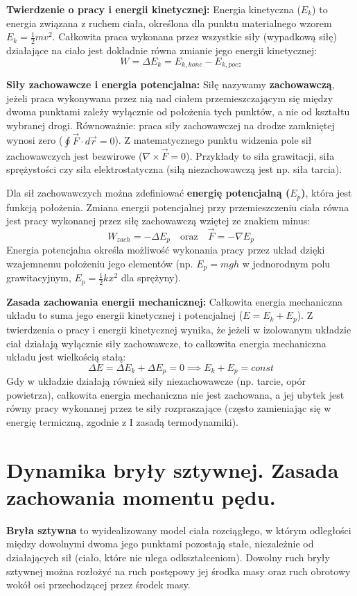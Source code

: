 \documentclass[11pt, a4paper]{article}
\begin{document}
\textbf{Twierdzenie o pracy i energii kinetycznej:} 
Energia kinetyczna ($E_k$) to energia związana z ruchem ciała, określona dla punktu materialnego wzorem $E_k = \frac{1}{2}mv^2$. Całkowita praca wykonana przez wszystkie siły (wypadkową siłę) działające na ciało jest dokładnie równa zmianie jego energii kinetycznej:
\[
W = \Delta E_k = E_{k, konc} - E_{k, pocz}
\]

\textbf{Siły zachowawcze i energia potencjalna:}
Siłę nazywamy \textbf{zachowawczą}, jeżeli praca wykonywana przez nią nad ciałem przemieszczającym się między dwoma punktami zależy wyłącznie od położenia tych punktów, a nie od kształtu wybranej drogi. Równoważnie: praca siły zachowawczej na drodze zamkniętej wynosi zero ($\oint \vec{F} \cdot d\vec{r} = 0$). Z matematycznego punktu widzenia pole sił zachowawczych jest bezwirowe ($\nabla \times \vec{F} = 0$). Przykłady to siła grawitacji, siła sprężystości czy siła elektrostatyczna (siłą niezachowawczą jest np. siła tarcia).

Dla sił zachowawczych można zdefiniować \textbf{energię potencjalną ($E_p$)}, która jest funkcją położenia. Zmiana energii potencjalnej przy przemieszczeniu ciała równa jest pracy wykonanej przez siłę zachowawczą wziętej ze znakiem minus:
\[
W_{zach} = -\Delta E_p \quad \text{oraz} \quad \vec{F} = -\nabla E_p
\]
Energia potencjalna określa możliwość wykonania pracy przez układ dzięki wzajemnemu położeniu jego elementów (np. $E_p = mgh$ w jednorodnym polu grawitacyjnym, $E_p = \frac{1}{2}kx^2$ dla sprężyny).

\textbf{Zasada zachowania energii mechanicznej:}
Całkowita energia mechaniczna układu to suma jego energii kinetycznej i potencjalnej ($E = E_k + E_p$). Z twierdzenia o pracy i energii kinetycznej wynika, że jeżeli w izolowanym układzie ciał działają wyłącznie siły zachowawcze, to całkowita energia mechaniczna układu jest wielkością stałą:
\[
\Delta E = \Delta E_k + \Delta E_p = 0 \implies E_k + E_p = const
\]
Gdy w układzie działają również siły niezachowawcze (np. tarcie, opór powietrza), całkowita energia mechaniczna nie jest zachowana, a jej ubytek jest równy pracy wykonanej przez te siły rozpraszające (często zamieniając się w energię termiczną, zgodnie z I zasadą termodynamiki).

\section{Dynamika bryły sztywnej. Zasada zachowania momentu pędu.}

\textbf{Bryła sztywna} to wyidealizowany model ciała rozciągłego, w którym odległości między dowolnymi dwoma jego punktami pozostają stałe, niezależnie od działających sił (ciało, które nie ulega odkształceniom). Dowolny ruch bryły sztywnej można rozłożyć na ruch postępowy jej środka masy oraz ruch obrotowy wokół osi przechodzącej przez środek masy.
\end{document}
